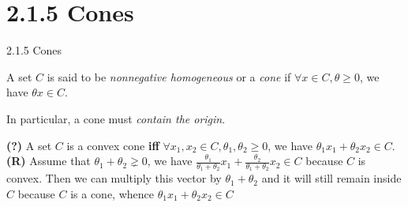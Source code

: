 \documentclass{beamer}
\begin{document}
\section{2.1.5 Cones}
\begin{frame}{2.1.5 Cones}
  \begin{definition}
    A set $C$ is said to be \textit{nonnegative homogeneous} or a \textit{cone} if $\forall x \in C, \theta \ge 0$, we
    have $\theta x \in C$.
  \end{definition}

  In particular, a cone must \textit{contain the origin}.

    \textbf{(?)} A set $C$ is a convex cone \textbf{iff} $\forall x_{1}, x_{2} \in C, \theta_{1}, \theta_{2} \ge 0$, we have
    $\theta_{1}x_{1} + \theta_{2}x_{2} \in C$.\\
    \textbf{(R)} Assume that $\theta_{1} + \theta_{2} \gneq 0$, we have
    $
      \frac{\theta_{1}}{\theta_{1} + \theta_{2}} x_{1}
      + \frac{\theta_{2}}{\theta_{1} + \theta_{2}} x_{2} \in C
    $ because $C$ is convex. Then we can multiply this vector by $\theta_{1} + \theta_{2}$ and
    it will still remain inside $C$ because $C$ is a cone, whence $\theta_{1}x_{1} + \theta_{2}x_{2} \in C$
\end{frame}
\end{document}

